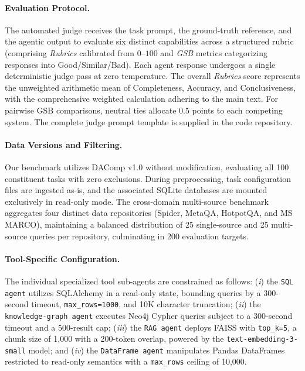 \paragraph{Evaluation Protocol.}
The automated judge receives the task prompt, the ground-truth reference, and the agentic output to evaluate six distinct capabilities across a structured rubric (comprising \emph{Rubrics} calibrated from $0$--$100$ and \emph{GSB} metrics categorizing responses into Good/Similar/Bad). Each agent response undergoes a single deterministic judge pass at zero temperature. The overall \emph{Rubrics} score represents the unweighted arithmetic mean of Completeness, Accuracy, and Conclusiveness, with the comprehensive weighted calculation adhering to the main text. For pairwise GSB comparisons, neutral ties allocate $0.5$ points to each competing system. The complete judge prompt template is supplied in the code repository.

\paragraph{Data Versions and Filtering.}
Our benchmark utilizes DAComp v1.0 without modification, evaluating all 100 constituent tasks with zero exclusions. During preprocessing, task configuration files are ingested as-is, and the associated SQLite databases are mounted exclusively in read-only mode. The cross-domain multi-source benchmark aggregates four distinct data repositories (Spider, MetaQA, HotpotQA, and MS MARCO), maintaining a balanced distribution of 25 single-source and 25 multi-source queries per repository, culminating in 200 evaluation targets.

\paragraph{Tool-Specific Configuration.}
The individual specialized tool sub-agents are constrained as follows: (\emph{i}) the \texttt{SQL agent} utilizes SQLAlchemy in a read-only state, bounding queries by a 300-second timeout, \texttt{max\_rows=1000}, and 10K character truncation; (\emph{ii}) the \texttt{knowledge-graph agent} executes Neo4j Cypher queries subject to a 300-second timeout and a 500-result cap; (\emph{iii}) the \texttt{RAG agent} deploys FAISS with \texttt{top\_k=5}, a chunk size of 1,000 with a 200-token overlap, powered by the \texttt{text-embedding-3-small} model; and (\emph{iv}) the \texttt{DataFrame agent} manipulates Pandas DataFrames restricted to read-only semantics with a \texttt{max\_rows} ceiling of 10,000.

